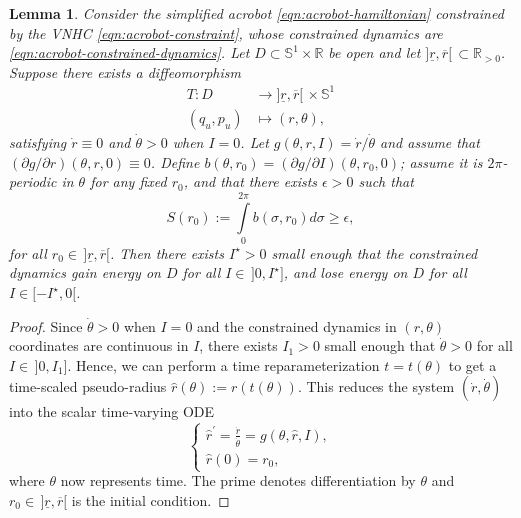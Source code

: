 \documentclass[journal,twoside,web]{ieeecolor}
\newtheorem{lemma}{Lemma} %
\newcommand*{\R}{\mathbb{R}}
\newcommand*{\Sone}{\mathbb{S}^1}
\newcommand*{\SxR}{\Sone \times \R}
\begin{document}
{\begin{lemma}\label{lemma:energy-regulation-D}
    Consider the simplified acrobot \eqref{eqn:acrobot-hamiltonian} constrained
    by the VNHC \eqref{eqn:acrobot-constraint}, whose constrained dynamics are
    \eqref{eqn:acrobot-constrained-dynamics}.
    Let \(D \subset \SxR\) be open and 
    let \(]\underline{r}, \overline{r}[ \, \subset \R_{> 0}\).
    Suppose there exists a diffeomorphism 
    \begin{align*}
        T : D &\to ]\underline{r},\overline{r}[ \, \times \Sone \\
        (q_u,p_u) &\mapsto (r,\theta)
        ,
    \end{align*}
    satisfying \(\dot{r} \equiv 0\) and \(\dot{\theta} > 0\) when
    \(I = 0\).
    Let \(g(\theta,r,I) = \dot{r}/\dot{\theta}\) and assume that 
    \((\partial g/\partial r)(\theta,r,0) \equiv 0\).
    Define \(b(\theta,r_0) = (\partial g/\partial I)(\theta,r_0,0)\);
    assume it is \(2\pi\)-periodic in \(\theta\) for any fixed \(r_0\),
    and that there exists \(\epsilon > 0\) such that 
    \[
        S(r_0) := \int \limits_0^{2\pi} b(\sigma,r_0)d\sigma \geq \epsilon
        ,
    \]
    for all \(r_0 \in \, ]\underline{r},\overline{r}[\).
    Then there exists \(I^\star > 0\) small enough that the constrained dynamics
    gain energy on \(D\) for all \(I \in \,]0, I^\star]\), and lose energy on \(D\)
    for all \(I \in [-I^\star, 0[\).
\end{lemma}
\begin{proof}
    Since \(\dot{\theta} > 0\) when \(I = 0\) and the constrained dynamics 
    in \((r,\theta)\) coordinates are continuous in \(I\), there exists 
    \(I_1 > 0\) small enough that \(\dot{\theta} > 0\) for all
    \(I \in \, ]0,I_1]\).
    Hence, we can perform a time reparameterization \(t = t(\theta)\) to get a
    time-scaled pseudo-radius \(\hat{r}(\theta) := r(t(\theta))\).
    This reduces the system \((\dot{r},\dot{\theta})\) into the scalar
    time-varying ODE 
    \begin{equation}\label{eqn:rhat-ode}
        \begin{cases}
            \hat{r}^\prime= \frac{\dot{r}}{\dot{\theta}} =
            g(\theta,\hat{r},I)
            , \\
            \hat{r}(0) = r_0
            ,
        \end{cases}
    \end{equation}
    where \(\theta\) now represents time.
    The prime denotes differentiation by \(\theta\) and 
    \(r_0 \in \, ]\underline{r},\overline{r}[\) is the initial condition.


\end{proof}}
\end{document}
